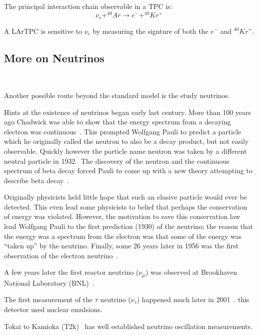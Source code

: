 The principal interaction chain observable in a TPC is:
\begin{equation}
    \nu_{e} + ^{40}Ar \rightarrow e^- + ^{40}Kr^{+}
\end{equation}

A LArTPC is sensitive to $\nu_{e}$ by measuring the signture of both the $e^{-}$ and $^{40}Kr^{+}$.

\subsection{More on Neutrinos}
~\label{sec:an_escape}

Another possible route beyond the standard model is the study neutrinos.

Hints at the existence of neutrinos began early last century.
More than 100 years ago Chadwick was able to show that the energy spectrum from a decaying electron was continuous~\citep{Chadwick:1914zz}.
This prompted Wolfgang Pauli to predict a particle which he originally called the neutron to also be a decay product, but not easily observable.
Quickly however the particle name neutron was taken by a different neutral particle in 1932~\citep{Chadwick1932PossibleEO}
The discovery of the neutron and the continuous spectrum of beta decay forced Pauli to come up with a new theory attempting to describe beta decay~\citep{pauli_1934}.

Originally physicists held little hope that such an elusive particle would ever be detected.
This even lead some physicists to belief that perhaps the conservation of energy was violated.
However, the motivation to save this conservation law lead Wolfgang Pauli to the first prediction (1930) of the neutrino; the reason that the energy was a spectrum from the electron was that some of the energy was ``taken up'' by the neutrino.
Finally, some 26 years later in 1956 was the first observation of the electron neutrino~\citep{first_neutrino_measurement}.


A few years later the first reactor neutrino ($\nu_{\mu}$) was observed at Brookhaven National Laboratory (BNL)~\citep{PhysRevLett.9.36}.

The first measurement of the $\tau$ neutrino ($\nu_{\tau}$) happened much later in 2001~\citep{tau_neutrino_discovery_KODAMA2001218}.
this detector used nuclear emulsions.


Tokai to Kamioka (T2k)~\citep{PhysRevD.91.072010_t2k_2015} has well established neutrino oscillation measurements.

